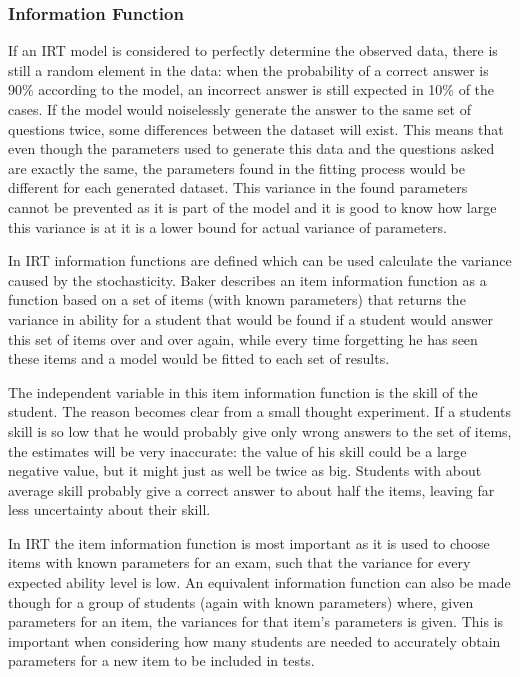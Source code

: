 \documentclass{scrartcl}
\begin{document}
\subsubsection{Information Function}
\label{sec:inherent}
If an IRT model is considered to perfectly determine the observed data, there is still a random element in the data: when the probability of a correct answer is 90\% according to the model, an incorrect answer is still expected in 10\% of the cases. If the model would noiselessly generate the answer to the same set of questions twice, some differences between the dataset will exist. This means that even though the parameters used to generate this data and the questions asked are exactly the same, the parameters found in the fitting process would be different for each generated dataset. This variance in the found parameters cannot be prevented as it is part of the model and it is good to know how large this variance is at it is a lower bound for actual variance of parameters.  

In IRT information functions are defined which can be used calculate the variance caused by the stochasticity. Baker \cite{basicbaker} describes an item information function as a function based on a set of items (with known parameters) that returns the variance in ability for a student that would be found if a student would answer this set of items over and over again, while every time forgetting he has seen these items and a model would be fitted to each set of results. 

The independent variable in this item information function is the skill of the student. The reason becomes clear from a small thought experiment. If a students skill is so low that he would probably give only wrong answers to the set of items, the estimates will be very inaccurate: the value of his skill could be a large negative value, but it might just as well be twice as big. Students with about average skill probably give a correct answer to about half the items, leaving far less uncertainty about their skill.

In IRT the item information function is most important as it is used to choose items with known parameters for an exam, such that the variance for every expected ability level is low. An equivalent information function can also be made though for a group of students (again with known parameters) where, given parameters for an item, the variances for that item's parameters is given. This is important when considering how many students are needed to accurately obtain parameters for a new item to be included in tests. 
\end{document}
